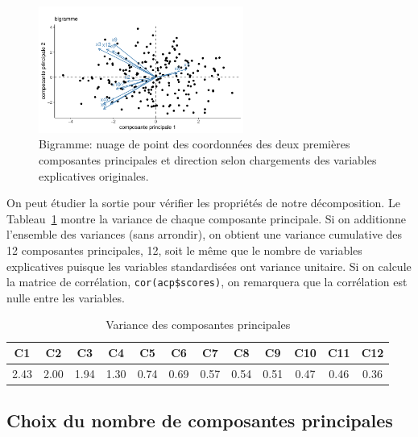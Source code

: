 \documentclass[
  11pt,
  letterpaper,
]{scrbook}
\theoremstyle{definition}
\theoremstyle{remark}
\begin{document}
\begin{figure}[ht!]

{\centering \includegraphics[width=0.6\textwidth,height=\textheight]{./02-analysefactorielle_files/figure-pdf/fig-biplot-1.pdf}

}

\caption{\label{fig-biplot}Bigramme: nuage de point des coordonnées des
deux premières composantes principales et direction selon chargements
des variables explicatives originales.}

\end{figure}

On peut étudier la sortie pour vérifier les propriétés de notre
décomposition. Le Tableau~\ref{tbl-eigenvalues} montre la variance de
chaque composante principale. Si on additionne l'ensemble des variances
(sans arrondir), on obtient une variance cumulative des 12 composantes
principales, 12, soit le même que le nombre de variables explicatives
puisque les variables standardisées ont variance unitaire. Si on calcule
la matrice de corrélation, \texttt{cor(acp\$scores)}, on remarquera que
la corrélation est nulle entre les variables.

\hypertarget{tbl-eigenvalues}{}
\begin{table}
\caption{\label{tbl-eigenvalues}Variance des composantes principales }\tabularnewline

\centering
\begin{tabular}{cccccccccccc}
\toprule
C1 & C2 & C3 & C4 & C5 & C6 & C7 & C8 & C9 & C10 & C11 & C12\\
\midrule
2.43 & 2.00 & 1.94 & 1.30 & 0.74 & 0.69 & 0.57 & 0.54 & 0.51 & 0.47 & 0.46 & 0.36\\
\bottomrule
\end{tabular}
\end{table}

\hypertarget{sec-acp-choix}{%
\subsection{Choix du nombre de composantes
principales}\label{sec-acp-choix}}
\end{document}
